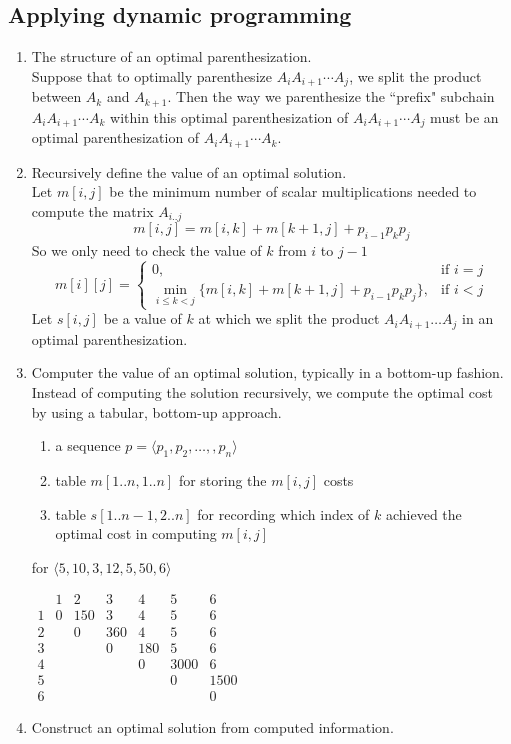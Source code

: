 \documentclass[a4paper]{article}
\begin{document}
\subsection*{Applying dynamic programming}
\begin{enumerate}
    \item The structure of an optimal parenthesization.\\
    Suppose that to optimally parenthesize $A_iA_{i+1}\cdots A_j$, we split the product between $A_k$ and $A_{k+1}$. Then the way we parenthesize the ``prefix" subchain $A_iA_{i+1}\cdots A_k$ within this optimal parenthesization of $A_iA_{i+1}\cdots A_j$ must be an optimal parenthesization of $A_iA_{i+1}\cdots A_k$.
    \item Recursively define the value of an optimal solution.\\
    Let $m[i,j]$ be the minimum number of scalar multiplications needed to compute the matrix $A_{i.. j}$
    $$
    m[i,j]=m[i,k]+m[k+1,j] +p_{i-1}p_kp_j
    $$
    So we only need to check the value of $k$ from $i$ to $j-1$
    $$
    m[i][j]=
        \begin{cases}
        0, & \text{if } i=j\\
        \min_{i\leq k <j}\{m[i,k]+m[k+1,j] +p_{i-1}p_kp_j\},  & \text{if $i<j$}
        \end{cases}
    $$
    Let $s[i,j]$ be a value of $k$ at which we split the product $A_iA_{i+1}\ldots A_j$ in an optimal parenthesization.
    \item Computer the value of an optimal solution, typically in a bottom-up fashion.\\
    Instead of computing the solution recursively, we compute the optimal cost by using a tabular, bottom-up approach.
    \begin{enumerate}
        \item a sequence $p=\langle p_1,p_2,\ldots, ,p_n\rangle $
        \item table $m[1..n, 1..n]$ for storing the $m[i,j]$ costs
        \item table $s[1..n-1,2..n]$ for recording which index of $k$ achieved the optimal cost in computing $m[i,j]$
    \end{enumerate}
    for $\langle5, 10, 3, 12, 5, 50, 6\rangle$
    \begin{center}
        $\begin{array}{c|cccccc}
         & 1 & 2 & 3 & 4 & 5 & 6\\
        \hline
         1 & 0 & 150 & 3 & 4 & 5 & 6\\
         2 &   & 0 & 360 & 4 & 5 & 6\\
         3 &   &   & 0 & 180 & 5 & 6\\
         4 &   &   &   & 0 & 3000 & 6\\
         5 &   &   &   &   & 0 & 1500\\
         6 &   &   &   &   &   & 0
        \end{array}
        $
    \end{center}
    
    

    \item Construct an optimal solution from computed information.
\end{enumerate}
\end{document}
